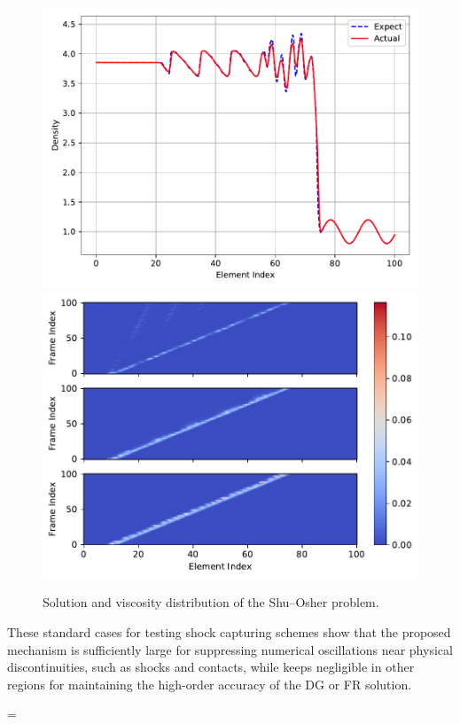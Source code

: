 \documentclass[10pt]{article}
\begin{document}
\begin{figure}[H]
  \centering
  \includegraphics[width=.49\textwidth]{./shu_osher/Frame100.pdf}
  \includegraphics[width=.49\textwidth]{./shu_osher/Viscosity.pdf}
  \caption{Solution and viscosity distribution of the Shu--Osher problem.}
  \label{fig:shu_osher}
\end{figure}

These standard cases for testing shock capturing schemes show that the proposed mechanism is sufficiently large for suppressing numerical oscillations near physical discontinuities, such as shocks and contacts, while keeps negligible in other regions for maintaining the high-order accuracy of the DG or FR solution.

\bibspacing=


\end{document}
